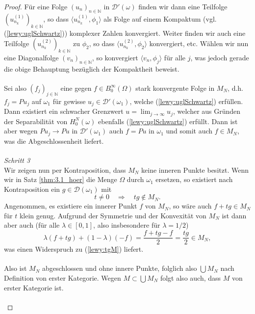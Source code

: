\begin{proof}
Für eine Folge $(u_n)_{n\in\mathbb{N}}$ in $\mathscr D'(\omega)$ finden wir dann eine Teilfolge $(u_{n_k}^{(1)})_{k\in\mathbb{N}}$, so dass
$\langle u_{n_k}^{(1)},\phi_1\rangle$ als Folge auf einem Kompaktum (vgl. (\ref{lewy:uglSchwartz})) komplexer Zahlen konvergiert. Weiter finden wir auch eine Teilfolge $(u_{n_k}^{(2)})_{k\in\mathbb{N}}$ zu $\phi_2$, so dass $\langle u_{n_k}^{(2)},\phi_2\rangle$ konvergiert, etc. Wählen wir nun eine Diagonalfolge $(v_n)_{n\in\mathbb{N}}$, so konvergiert $\langle v_n,\phi_j\rangle$ für alle $j$, was jedoch gerade die obige Behauptung bezüglich der Kompaktheit beweist.\\\\
Sei also $(f_j)_{j\in\mathbb{N}}$ eine gegen $f\in B_0^\infty(\Omega)$ stark konvergente Folge in $M_N$, d.h. $f_j=Pu_j$ auf $\omega_1$ für gewisse $u_j\in\mathscr{D}'(\omega_1)$, welche (\ref{lewy:uglSchwartz}) erfüllen. Dann existiert ein schwacher Grenzwert $u=\lim_{j\rightarrow\infty}u_j$, welcher aus Gründen der Separabilität von $H_0^N(\omega)$ ebenfalls (\ref{lewy:uglSchwartz}) erfüllt. Dann ist aber wegen $Pu_j\rightarrow Pu$ in $\mathscr D'(\omega_1)$ auch $f=Pu$ in $\omega_1$ und somit auch $f\in M_N$, was die Abgeschlossenheit liefert.\\\\
\textit{Schritt 3}\\
Wir zeigen nun per Kontraposition, dass $M_N$ keine inneren Punkte besitzt. Wenn wir in Satz \ref{thm:3.1_hoer} die Menge $\Omega$ durch $\omega_1$ ersetzen, so existiert nach Kontraposition ein $g\in\mathscr{D}(\omega_1)$ mit
\begin{equation}\label{lewy:tgM}
t\neq 0\quad\Rightarrow\quad tg\notin M_N.
\end{equation}
Angenommen, es existiere ein innerer Punkt $f$ von $M_N$, so wäre auch $f+tg\in M_N$ für $t$ klein genug. Aufgrund der Symmetrie und der Konvexität von $M_N$ ist dann aber auch (für alle $\lambda\in[0,1]$, also insbesondere für $\lambda=1/2$)
\begin{equation}
\lambda(f+tg)+(1-\lambda)(-f) = \frac{f+tg-f}{2}=\frac{tg}{2}\in M_N,
\end{equation}
was einen Widerspruch zu (\ref{lewy:tgM}) liefert.\\\\
Also ist $M_N$ abgeschlossen und ohne innere Punkte, folglich also $\bigcup M_N$ nach Definition von erster Kategorie. Wegen $M\subset\bigcup M_N$ folgt also auch, dass $M$ von erster Kategorie ist.\\\\

\end{proof}

